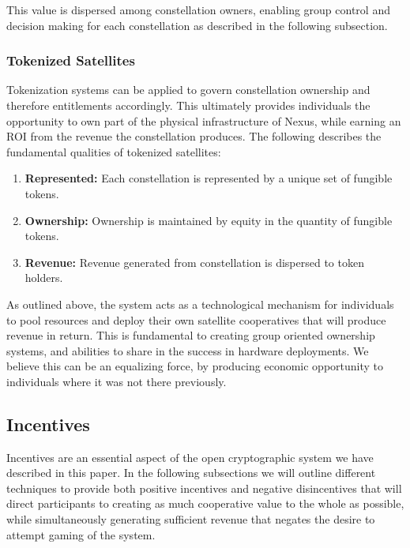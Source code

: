 \documentclass[11pt]{article}
\begin{document}
\noindent This value is dispersed among constellation owners, enabling group control and decision making for each constellation as described in the following subsection.

\subsubsection{Tokenized Satellites}
\label{tokenized-satellites}

Tokenization systems can be applied to govern constellation ownership and therefore entitlements accordingly.
This ultimately provides individuals the opportunity to own part of the physical infrastructure of Nexus, while earning an ROI from the revenue the constellation produces.
The following describes the fundamental qualities of tokenized satellites:

\begin{enumerate}
    \item \textbf{Represented:} Each constellation is represented by a unique set of fungible tokens.
    \item \textbf{Ownership:} Ownership is maintained by equity in the quantity of fungible tokens.
    \item \textbf{Revenue:} Revenue generated from constellation is dispersed to token holders.
\end{enumerate}

\noindent As outlined above, the system acts as a technological mechanism for individuals to pool resources and deploy their own satellite cooperatives that will produce revenue in return.
This is fundamental to creating group oriented ownership systems, and abilities to share in the success in hardware deployments.
We believe this can be an equalizing force, by producing economic opportunity to individuals where it was not there previously.



\subsection{Incentives}

Incentives are an essential aspect of the open cryptographic system we have described in this paper. 
In the following subsections we will outline different techniques to provide both positive incentives and negative disincentives that will direct participants to creating as much cooperative value to the whole as possible, while simultaneously generating sufficient revenue that negates the desire to attempt gaming of the system.
\end{document}
